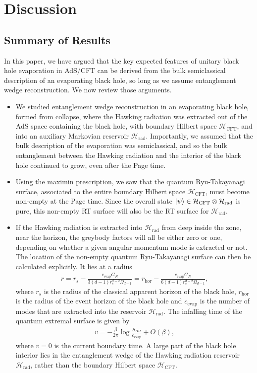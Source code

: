 \documentclass[12pt]{article}
\begin{document}
\section{Discussion} \label{sec:discuss}

\subsection{Summary of Results}
In this paper, we have argued that the key expected features of unitary black hole evaporation in AdS/CFT can be derived from the bulk semiclassical description of an evaporating black hole, so long as we assume entanglement wedge reconstruction. We now review those arguments.
\begin{itemize}

\item We studied entanglement wedge reconstruction in an evaporating black hole, formed from collapse, where the Hawking radiation was extracted out of the AdS space containing the black hole, with boundary Hilbert space $\mathcal{H}_\text{CFT}$, and into an auxiliary Markovian reservoir $\mathcal{H}_\text{rad}$. Importantly, we assumed that the bulk description of the evaporation was semiclassical, and so the bulk entanglement between the Hawking radiation and the interior of the black hole continued to grow, even after the Page time.

\item Using the maximin prescription, we saw that the quantum Ryu-Takayanagi surface, associated to the entire boundary Hilbert space $\mathcal{H}_\text{CFT}$, must become non-empty at the Page time. Since the overall state $\ket{\psi} \in \mathcal{H}_\text{CFT} \otimes \mathcal{H}_\text{rad}$ is pure, this non-empty RT surface will also be the RT surface for $\mathcal{H}_\text{rad}$.

\item If the Hawking radiation is extracted into $\mathcal{H}_\text{rad}$ from deep inside the zone, near the horizon, the greybody factors will all be either zero or one, depending on whether a given angular momentum mode is extracted or not. The location of the non-empty quantum Ryu-Takayanagi surface can then be calculated explicitly. It lies at a radius
\begin{align}
r = r_s -  \frac{c_\text{evap} G_N}{3 (d-1) r_s^{d-2} \Omega_{d-1}} = r_\text{hor} -  \frac{c_\text{evap} G_N}{6 (d-1) r_s^{d-2} \Omega_{d-1}},
\end{align}
where $r_s$ is the radius of the classical apparent horizon of the black hole, $r_\text{hor}$ is the radius of the event horizon of the black hole and $c_\text{evap}$ is the number of modes that are extracted into the reservoir $\mathcal{H}_\text{rad}$. The infalling time of the quantum extremal surface is given by
\begin{align}
v = - \frac{\beta}{2 \pi} \log\frac{S_{BH}}{c_\text{evap}} + O(\beta),
\end{align}
where $v=0$ is the current boundary time. A large part of the black hole interior lies in the entanglement wedge of the Hawking radiation reservoir $\mathcal{H}_\text{rad}$, rather than the boundary Hilbert space $\mathcal{H}_\text{CFT}$.


\end{itemize}
\end{document}
